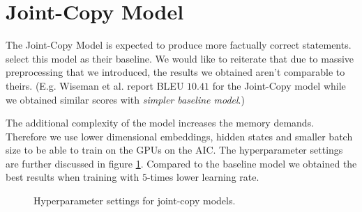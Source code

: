 \section{Joint-Copy Model}

The Joint-Copy Model is expected to produce more factually correct statements. \citet{wiseman2017} select this model as their baseline. We would like to reiterate that due to massive preprocessing that we introduced, the results we obtained aren't comparable to theirs. (E.g. Wiseman et al. report BLEU $10.41$ for the Joint-Copy model while we obtained similar scores with \emph{simpler baseline model}.)

The additional complexity of the model increases the memory demands. The\-refore we use lower dimensional embeddings, hidden states and smaller batch size to be able to train on the GPUs on the AIC. The hyperparameter settings are further discussed in figure \ref{figure:hyperparameters_copy_low_lr}. Compared to the baseline model we obtained the best results when training with $5$-times lower learning rate.

\begin{figure}[h]
    \caption{Hyperparameter settings for joint-copy models.} \label{figure:hyperparameters_copy_low_lr}
\end{figure}

